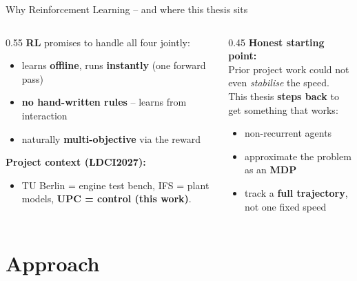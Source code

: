 \documentclass[aspectratio=169,11pt]{beamer}
\newcommand{\keyword}[1]{\textcolor{tugreen}{\textbf{#1}}}
\begin{document}
\begin{frame}{Why Reinforcement Learning -- and where this thesis sits}
  \begin{columns}[T]
    \begin{column}{0.55\textwidth}
      \keyword{RL} promises to handle all four jointly:
      \begin{itemize}
        \item learns \keyword{offline}, runs \keyword{instantly} (one forward pass)
        \item \keyword{no hand-written rules} -- learns from interaction
        \item naturally \keyword{multi-objective} via the reward
      \end{itemize}
      \vspace{0.6em}
      \textbf{Project context (LDCI2027):}
      \footnotesize
      \begin{itemize}\footnotesize
        \item TU Berlin = engine test bench, IFS = plant models, \keyword{UPC = control (this work)}.
      \end{itemize}
    \end{column}
    \begin{column}{0.45\textwidth}
      \footnotesize \textbf{Honest starting point:}\\[0.3em]
      Prior project work could not even \emph{stabilise} the speed.\\[0.4em]
      This thesis \keyword{steps back} to get something that works:
      \begin{itemize}\footnotesize
        \item non-recurrent agents
        \item approximate the problem as an \keyword{MDP}
        \item track a \keyword{full trajectory}, not one fixed speed
      \end{itemize}
    \end{column}
  \end{columns}
\end{frame}

\section{Approach}
\end{document}
